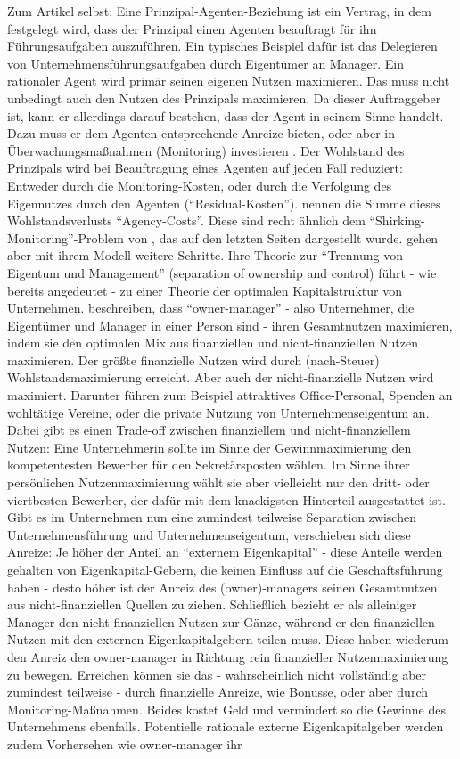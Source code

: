 Zum Artikel selbst: Eine Prinzipal-Agenten-Beziehung ist ein Vertrag, in dem festgelegt wird, dass der Prinzipal einen Agenten beauftragt für ihn Führungsaufgaben auszuführen. Ein typisches Beispiel dafür ist das Delegieren von Unternehmensführungsaufgaben durch Eigentümer an Manager. Ein rationaler Agent wird primär seinen eigenen Nutzen maximieren. Das muss nicht unbedingt auch den Nutzen des Prinzipals maximieren. Da dieser Auftraggeber ist, kann er allerdings darauf bestehen, dass der Agent in seinem Sinne handelt. Dazu muss er dem Agenten entsprechende Anreize bieten, oder aber in Überwachungsmaßnahmen (Monitoring) investieren \parencite[S. 310]{Jensen1976}. Der  Wohlstand des Prinzipals wird bei Beauftragung eines Agenten auf jeden Fall reduziert: Entweder durch die Monitoring-Kosten, oder durch die Verfolgung des Eigennutzes durch den Agenten ("`Residual-Kosten"'). \textcite{Jensen1976} nennen die Summe dieses Wohlstandsverlusts "`Agency-Costs"'. Diese sind recht ähnlich dem "`Shirking-Monitoring"'-Problem von \textcite{Alchian1972}, das auf den letzten Seiten dargestellt wurde. \textcite{Jensen1976} gehen aber mit ihrem Modell weitere Schritte. Ihre Theorie zur "`Trennung von Eigentum und Management"' (separation of ownership and control) führt - wie bereits angedeutet - zu einer Theorie der optimalen Kapitalstruktur von Unternehmen. \textcite{Jensen1976} beschreiben, dass "`owner-manager"' - also Unternehmer, die Eigentümer und Manager in einer Person sind - ihren Gesamtnutzen maximieren, indem sie den optimalen Mix aus finanziellen und nicht-finanziellen Nutzen maximieren. Der größte finanzielle Nutzen wird durch (nach-Steuer) Wohlstandsmaximierung erreicht. Aber auch der nicht-finanzielle Nutzen wird maximiert. Darunter führen \textcite[S. 316]{Jensen1976} zum Beispiel attraktives Office-Personal, Spenden an wohltätige Vereine, oder die private Nutzung von Unternehmenseigentum an. Dabei gibt es einen Trade-off zwischen finanziellem und nicht-finanziellem Nutzen: Eine Unternehmerin sollte im Sinne der Gewinnmaximierung den kompetentesten Bewerber für den Sekretärsposten wählen. Im Sinne ihrer persönlichen Nutzenmaximierung wählt sie aber vielleicht nur den dritt- oder viertbesten Bewerber, der dafür mit dem knackigsten Hinterteil ausgestattet ist. Gibt es im Unternehmen nun eine zumindest teilweise Separation zwischen Unternehmensführung und Unternehmenseigentum, verschieben sich diese Anreize: Je höher der Anteil an "`externem Eigenkapital"' - diese Anteile werden gehalten von Eigenkapital-Gebern, die keinen Einfluss auf die Geschäftsführung haben - desto höher ist der Anreiz des (owner)-managers seinen Gesamtnutzen aus nicht-finanziellen Quellen zu ziehen. Schließlich bezieht er als alleiniger Manager den nicht-finanziellen Nutzen zur Gänze, während er den finanziellen Nutzen mit den externen Eigenkapitalgebern teilen muss. Diese haben wiederum den Anreiz den owner-manager in Richtung rein finanzieller Nutzenmaximierung zu bewegen. Erreichen können sie das - wahrscheinlich nicht vollständig aber zumindest teilweise - durch finanzielle Anreize, wie Bonusse, oder aber durch Monitoring-Maßnahmen. Beides kostet Geld und vermindert so die Gewinne des Unternehmens ebenfalls. Potentielle rationale externe Eigenkapitalgeber werden zudem Vorhersehen wie owner-manager ihr 